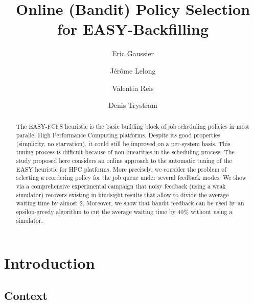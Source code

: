\documentclass[sigconf,anonymous]{acmart}
\begin{document}
%
\title{Online (Bandit) Policy Selection for EASY-Backfilling}

\author{Eric Gaussier}
\author{J\'er\^ome Lelong}
\author{Valentin Reis}
\author{Denis Trystram}

\begin{abstract}

  The EASY-FCFS heuristic is the basic building block of job scheduling
  policies in most parallel High Performance Computing platforms. Despite
  its good properties (simplicity, no starvation), it could still be improved
  on a per-system basis. This tuning process is difficult because of
  non-linearities in the scheduling process. The study proposed here considers
  an online approach to the automatic tuning of the EASY heuristic for HPC
  platforms. More precisely, we consider the problem of selecting a reordering
  policy for the job queue under several feedback modes. We show via a
  comprehensive experimental campaign that noisy feedback (using a weak
  simulator) recovers existing in-hindsight results that allow to divide the
  average waiting time by almost 2. Moreover, we show that bandit feedback can
  be used by an epsilon-greedy algorithm to cut the average waiting time by
  40\% without using a simulator.

\end{abstract}

\maketitle


\section{Introduction}
\label{sec:intro}

\subsection{Context}
\end{document}
